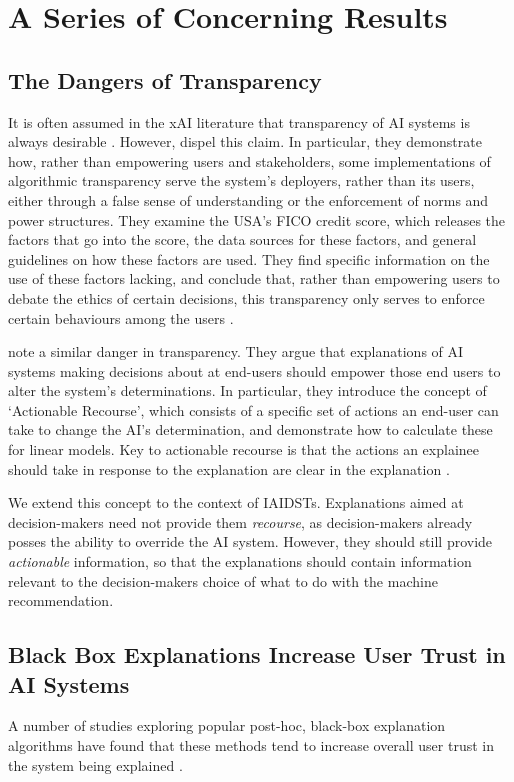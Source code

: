\section{A Series of Concerning Results}
\subsection{The Dangers of Transparency}
It is often assumed in the xAI literature that transparency of AI systems is always desirable \cite{molnar_interpretable_2019,miller_explanation_2017-1}. However, \textcite{wang_transparency_2022} dispel this claim. In particular, they demonstrate how, rather than empowering users and stakeholders, some implementations of algorithmic transparency serve the system's deployers, rather than its users, either through a false sense of understanding or the enforcement of norms and power structures. They examine the USA's FICO credit score, which releases the factors that go into the score, the data sources for these factors, and general guidelines on how these factors are used. They find specific information on the use of these factors lacking, and conclude that, rather than empowering users to debate the ethics of certain decisions, this transparency only serves to enforce certain behaviours among the users \cite{wang_transparency_2022}.

\textcite{ustun_actionable_2019} note a similar danger in transparency. They argue that explanations of AI systems making decisions about at end-users should empower those end users to alter the system's determinations. In particular, they introduce the concept of `Actionable Recourse', which consists of a specific set of actions an end-user can take to change the AI's determination, and demonstrate how to calculate these for linear models. Key to actionable recourse is that the actions an explainee should take in response to the explanation are clear in the explanation \cite{ustun_actionable_2019}.

We extend this concept to the context of IAIDSTs. Explanations aimed at decision-makers need not provide them \emph{recourse}, as decision-makers already posses the ability to override the AI system. However, they should still provide \emph{actionable} information, so that the explanations should contain information relevant to the decision-makers choice of what to do with the machine recommendation.

\subsection{Black Box Explanations Increase User Trust in AI Systems}
A number of studies exploring popular post-hoc, black-box explanation algorithms have found that these methods tend to increase overall user trust in the system being explained \cite{ford_play_2020,jacobs_how_2021,wang_transparency_2022}. 

